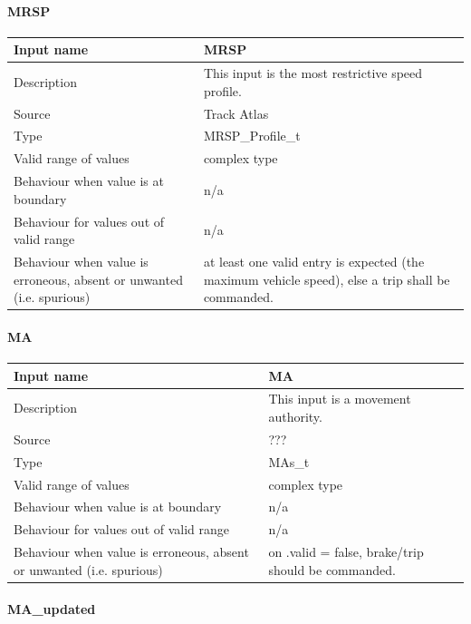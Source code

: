 \paragraph{MRSP}

\begin{longtable}{p{}p{}}
\toprule
Input name				& MRSP \\
\midrule
Description				& This input is the most restrictive speed profile. \\
\midrule
Source					& Track Atlas \\ 
\midrule
Type					& MRSP\_Profile\_t \\
\midrule
Valid range of values	& complex type \\
\midrule
Behaviour when value is at boundary	& n/a \\
\midrule
Behaviour for values out of valid range	& n/a \\
\midrule
Behaviour when value is erroneous, absent or unwanted (i.e. spurious) & at least one valid entry is expected (the maximum vehicle speed), else a trip shall be commanded. \\
\bottomrule
\end{longtable}


\paragraph{MA}

\begin{longtable}{p{}p{}}
\toprule
Input name				& MA \\
\midrule
Description				& This input is a movement authority. \\
\midrule
Source					& ??? \\ 
\midrule
Type					& MAs\_t \\
\midrule
Valid range of values	& complex type \\
\midrule
Behaviour when value is at boundary	& n/a \\
\midrule
Behaviour for values out of valid range	& n/a \\
\midrule
Behaviour when value is erroneous, absent or unwanted (i.e. spurious) & on .valid = false, brake/trip should be commanded. \\
\bottomrule
\end{longtable}


\paragraph{MA\_updated}

